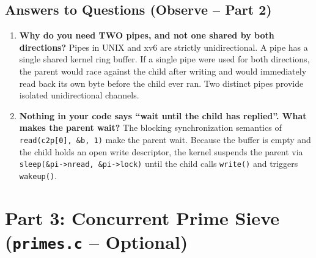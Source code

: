 \documentclass[12pt,a4paper]{article}
\begin{document}
\subsection{Answers to Questions (Observe -- Part 2)}
\begin{enumerate}
    \item \textbf{Why do you need TWO pipes, and not one shared by both directions?}  
    Pipes in UNIX and xv6 are strictly unidirectional. A pipe has a single shared kernel ring buffer. If a single pipe were used for both directions, the parent would race against the child after writing and would immediately read back its own byte before the child ever ran. Two distinct pipes provide isolated unidirectional channels.

    \item \textbf{Nothing in your code says ``wait until the child has replied''. What makes the parent wait?}  
    The blocking synchronization semantics of \texttt{read(c2p[0], \&b, 1)} make the parent wait. Because the buffer is empty and the child holds an open write descriptor, the kernel suspends the parent via \texttt{sleep(\&pi->nread, \&pi->lock)} until the child calls \texttt{write()} and triggers \texttt{wakeup()}.
\end{enumerate}

\newpage

\section{Part 3: Concurrent Prime Sieve (\texttt{primes.c} -- Optional)}
\end{document}
